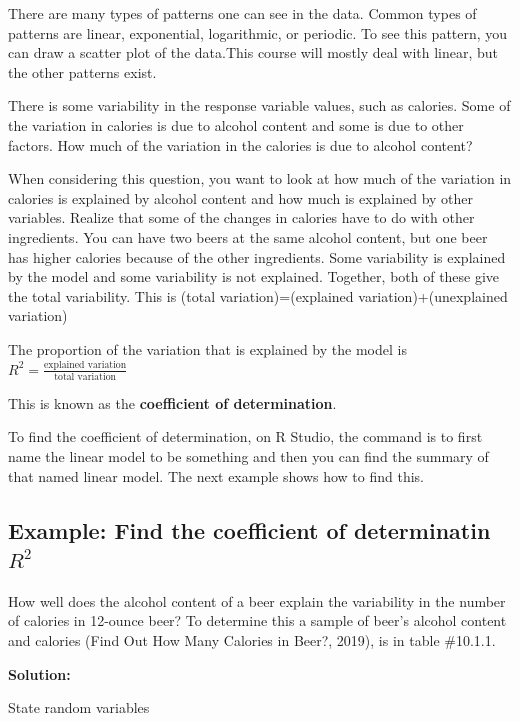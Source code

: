 \documentclass[
]{book}
\begin{document}
There are many types of patterns one can see in the data. Common types of patterns are linear, exponential, logarithmic, or periodic. To see this pattern, you can draw a scatter plot of the data.This course will mostly deal with linear, but the other patterns exist.

There is some variability in the response variable values, such as calories. Some of the variation in calories is due to alcohol content and some is due to other factors. How much of the variation in the calories is due to alcohol content?

When considering this question, you want to look at how much of the variation in calories is explained by alcohol content and how much is explained by other variables. Realize that some of the changes in calories have to do with other ingredients. You can have two beers at the same alcohol content, but one beer has higher calories because of the other ingredients. Some variability is explained by the model and some variability is not explained. Together, both of these give the total variability. This is (total variation)=(explained variation)+(unexplained variation)

The proportion of the variation that is explained by the model is \(R^2=\frac{\text{explained variation}}{\text{total variation}}\)

This is known as the \textbf{coefficient of determination}.

To find the coefficient of determination, on R Studio, the command is to first name the linear model to be something and then you can find the summary of that named linear model. The next example shows how to find this.

\hypertarget{example-find-the-coefficient-of-determinatin-r2}{%
\subsection{\texorpdfstring{Example: Find the coefficient of determinatin \(R^2\)}{Example: Find the coefficient of determinatin R\^{}2}}\label{example-find-the-coefficient-of-determinatin-r2}}

How well does the alcohol content of a beer explain the variability in the number of calories in 12-ounce beer? To determine this a sample of beer's alcohol content and calories (Find Out How Many Calories in Beer?, 2019), is in table \#10.1.1.

\textbf{Solution:}

State random variables
\end{document}
